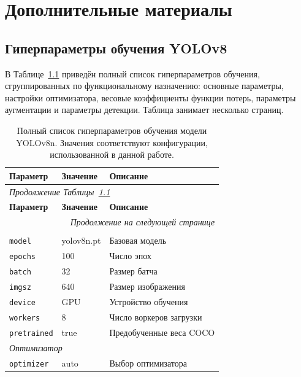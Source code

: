 \chapter{Дополнительные материалы}
\label{app:supplementary}

\section{Гиперпараметры обучения YOLOv8}

В Таблице~\ref{tab:hp_full} приведён полный список гиперпараметров обучения, сгруппированных по функциональному назначению: основные параметры, настройки оптимизатора, весовые коэффициенты функции потерь, параметры аугментации и параметры детекции. Таблица занимает несколько страниц.

\begin{longtable}{p{3.8cm} p{2.6cm} p{7cm}}
\caption{Полный список гиперпараметров обучения модели YOLOv8n. Значения соответствуют конфигурации, использованной в данной работе.}
\label{tab:hp_full} \\
\toprule
\textbf{Параметр} & \textbf{Значение} & \textbf{Описание} \\
\midrule
\endfirsthead
\multicolumn{3}{l}{\textit{Продолжение Таблицы~\ref{tab:hp_full}}} \\
\toprule
\textbf{Параметр} & \textbf{Значение} & \textbf{Описание} \\
\midrule
\endhead
\midrule
\multicolumn{3}{r}{\textit{Продолжение на следующей странице}} \\
\endfoot
\bottomrule
\endlastfoot
\multicolumn{3}{l}{\textit{Основные параметры}} \\
\texttt{model}            & yolov8n.pt & Базовая модель \\
\texttt{epochs}           & 100        & Число эпох \\
\texttt{batch}            & 32         & Размер батча \\
\texttt{imgsz}            & 640        & Размер изображения \\
\texttt{device}           & GPU        & Устройство обучения \\
\texttt{workers}          & 8          & Число воркеров загрузки \\
\texttt{pretrained}       & true       & Предобученные веса COCO \\
\midrule
\multicolumn{3}{l}{\textit{Оптимизатор}} \\
\texttt{optimizer}        & auto       & Выбор оптимизатора \\

\end{longtable}
